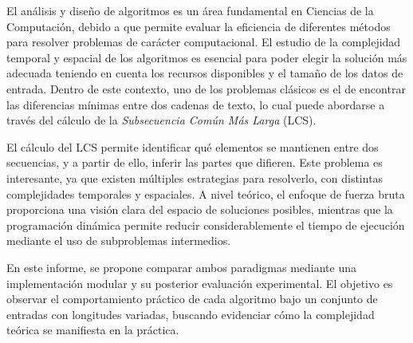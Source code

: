 El análisis y diseño de algoritmos es un área fundamental en Ciencias de la Computación, debido a que permite evaluar la eficiencia de diferentes métodos para resolver problemas de carácter computacional. El estudio de la complejidad temporal y espacial de los algoritmos es esencial para poder elegir la solución más adecuada teniendo en cuenta los recursos disponibles y el tamaño de los datos de entrada. Dentro de este contexto, uno de los problemas clásicos es el de encontrar las diferencias mínimas entre dos cadenas de texto, lo cual puede abordarse a través del cálculo de la \textit{Subsecuencia Común Más Larga} (LCS).

El cálculo del LCS permite identificar qué elementos se mantienen entre dos secuencias, y a partir de ello, inferir las partes que difieren. Este problema es interesante, ya que existen múltiples estrategias para resolverlo, con distintas complejidades temporales y espaciales. A nivel teórico, el enfoque de fuerza bruta proporciona una visión clara del espacio de soluciones posibles, mientras que la programación dinámica permite reducir considerablemente el tiempo de ejecución mediante el uso de subproblemas intermedios.

En  este informe, se propone comparar ambos paradigmas mediante una implementación modular y su posterior evaluación experimental. El objetivo es observar el comportamiento práctico de cada algoritmo bajo un conjunto de entradas con longitudes variadas, buscando evidenciar cómo la complejidad teórica se manifiesta en la práctica.
